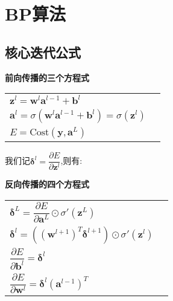 \newpage
\section{BP算法}
\subsection{核心迭代公式}
\begin{center}
  \begin{minipage}{0.7\textwidth}
    \begin{framed}
      \centering
      \textbf{前向传播的三个方程式}\label{backpropsummary}\\
      \vspace{1.5ex}
      \begin{tabular}{ll}
        $\bm{z}^l=\bm{w}^l\bm{a}^{l-1}+\bm{b}^l$            & \hspace{2cm} \\[1.5ex]
        $\bm{a}^l=\sigma\left(\bm{w}^l\bm{a}^{l-1}+\bm{b}^l\right)=\sigma(\bm{z}^l)$ & \hspace{2cm} \\[1.5ex]
        $E=\text{Cost}(\bm{y},\bm{a}^L )$       & \hspace{2cm} \\[1.5ex]
      
      \end{tabular}
    \end{framed}
  \end{minipage}
\end{center}

我们记$\bm{\delta} ^l=\dfrac{\partial E}{\partial\bm{z}^l}$,则有:
\begin{center}
  \begin{minipage}{0.7\textwidth}
    \begin{framed}
      \centering
      \textbf{反向传播的四个方程式}\label{backpropsummary}\\
      \vspace{1.5ex}
      \begin{tabular}{ll}
        $\bm{\delta}^L = \dfrac{\partial E}{\partial\bm{a}^L}\odot\sigma'(\bm{z}^L)$            & \hspace{2cm} \\[1.5ex]
        $\bm{\delta}^l = ((\bm{w}^{l+1})^T \bm{\delta}^{l+1}) \odot \sigma'(\bm{z}^l)$ & \hspace{2cm} \\[1.5ex]
        $\dfrac{\partial E}{\partial \bm{b}^l} = \bm{\delta}^l$       & \hspace{2cm} \\[1.5ex]
        $\dfrac{\partial E}{\partial \bm{w}^l} = \bm{\delta}^l(\bm{a}^{l-1})^T$ & \hspace{2cm}
      \end{tabular}
    \end{framed}
  \end{minipage}
\end{center}






